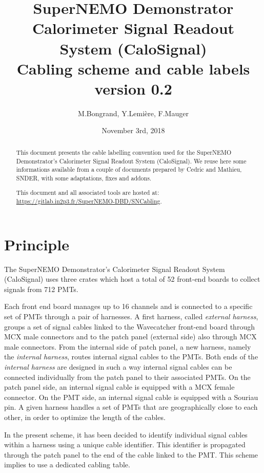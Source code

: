 \documentclass[12pt,a4paper]{article}
\title{SuperNEMO Demonstrator\\
  Calorimeter Signal Readout System (CaloSignal)\\
  Cabling scheme and cable labels\\
  version 0.2\\
[DocDB #4761]}
\author{M.Bongrand, Y.Lemi\`ere, F.Mauger}
\date{November 3rd, 2018}
\begin{document}
\maketitle

\begin{abstract}
  \noindent This document presents the cable labelling convention used
  for  the SuperNEMO  Demonstrator's Calorimeter Signal Readout  System
  (CaloSignal).  We reuse  here some informations available  from a couple
  of documents prepared  by Cedric and Mathieu, SNDER,  with some adaptations,
  fixes and addons.
  
  \vskip 10pt
  \noindent This document and all associated tools
  are hosted at:
  \vskip 5pt
  \url{https://gitlab.in2p3.fr/SuperNEMO-DBD/SNCabling}.

\end{abstract}

\tableofcontents
\vfill

\clearpage
\section{Principle}

The  SuperNEMO   Demonstrator's  Calorimeter  Signal   Readout  System
(CaloSignal)  uses three  crates which  host a  total of  52 front-end
boards to collect signals from 712 PMTs.

Each front end board  manages up to 16 channels and  is connected to a
specific set  of PMTs through a  pair of harnesses.  A  first harness,
called \emph{external harness},  groups a set of  signal cables linked
to the Wavecatcher front-end board  through MCX male connectors and to
the  patch panel  (external side)  also through  MCX male  connectors.
From  the internal side  of patch panel, a
new  harness,  namely  the \emph{internal  harness},  routes  internal
signal cables to  the PMTs.  Both ends of  the \emph{internal harness}
are designed in  such  a  way internal  signal  cables  can be  connected
individually from  the patch  panel to their  associated PMTs.  On the
patch panel  side, an  internal signal  cable is  equipped with  a MCX
female  connector.  On  the  PMT  side, an  internal  signal cable  is
equipped with  a Souriau pin.  A  given harness handles a  set of PMTs
that are geographically close to each  other, in order to optimize the
length of the cables.

In  the present  scheme, it  has been  decided to  identify individual
signal cables within a harness  using a unique cable identifier.  This
identifier is  propagated through the  patch panel  to the end  of the
cable  linked to  the PMT.   This scheme  implies to  use a  dedicated
cabling table.
\end{document}
